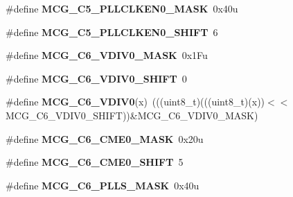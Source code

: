 \begin{DoxyCompactItemize}
\item 
\#define {\bfseries M\+C\+G\+\_\+\+C5\+\_\+\+P\+L\+L\+C\+L\+K\+E\+N0\+\_\+\+M\+A\+SK}~0x40u\hypertarget{group__MCG__Register__Masks_ga73671453b8f8804784e5b7e67551726d}{}\label{group__MCG__Register__Masks_ga73671453b8f8804784e5b7e67551726d}

\item 
\#define {\bfseries M\+C\+G\+\_\+\+C5\+\_\+\+P\+L\+L\+C\+L\+K\+E\+N0\+\_\+\+S\+H\+I\+FT}~6\hypertarget{group__MCG__Register__Masks_gaa66ceed70e1055a31e46c60a502b8eb7}{}\label{group__MCG__Register__Masks_gaa66ceed70e1055a31e46c60a502b8eb7}

\item 
\#define {\bfseries M\+C\+G\+\_\+\+C6\+\_\+\+V\+D\+I\+V0\+\_\+\+M\+A\+SK}~0x1\+Fu\hypertarget{group__MCG__Register__Masks_gacf93ac207865bd372d9148f10dce7267}{}\label{group__MCG__Register__Masks_gacf93ac207865bd372d9148f10dce7267}

\item 
\#define {\bfseries M\+C\+G\+\_\+\+C6\+\_\+\+V\+D\+I\+V0\+\_\+\+S\+H\+I\+FT}~0\hypertarget{group__MCG__Register__Masks_ga92208f56fc7ce68a0a8ff14ab5c3b2f6}{}\label{group__MCG__Register__Masks_ga92208f56fc7ce68a0a8ff14ab5c3b2f6}

\item 
\#define {\bfseries M\+C\+G\+\_\+\+C6\+\_\+\+V\+D\+I\+V0}(x)~(((uint8\+\_\+t)(((uint8\+\_\+t)(x))$<$$<$M\+C\+G\+\_\+\+C6\+\_\+\+V\+D\+I\+V0\+\_\+\+S\+H\+I\+FT))\&M\+C\+G\+\_\+\+C6\+\_\+\+V\+D\+I\+V0\+\_\+\+M\+A\+SK)\hypertarget{group__MCG__Register__Masks_ga50b2068270153c3013b4e0ac2256fbfd}{}\label{group__MCG__Register__Masks_ga50b2068270153c3013b4e0ac2256fbfd}

\item 
\#define {\bfseries M\+C\+G\+\_\+\+C6\+\_\+\+C\+M\+E0\+\_\+\+M\+A\+SK}~0x20u\hypertarget{group__MCG__Register__Masks_ga2e0daa102ec3f225ed9297f7bc9f8239}{}\label{group__MCG__Register__Masks_ga2e0daa102ec3f225ed9297f7bc9f8239}

\item 
\#define {\bfseries M\+C\+G\+\_\+\+C6\+\_\+\+C\+M\+E0\+\_\+\+S\+H\+I\+FT}~5\hypertarget{group__MCG__Register__Masks_ga096e62e71f69f5b749999d671d800090}{}\label{group__MCG__Register__Masks_ga096e62e71f69f5b749999d671d800090}

\item 
\#define {\bfseries M\+C\+G\+\_\+\+C6\+\_\+\+P\+L\+L\+S\+\_\+\+M\+A\+SK}~0x40u\hypertarget{group__MCG__Register__Masks_ga66a1dfdde86a9c165d7bdec17c77578f}{}\label{group__MCG__Register__Masks_ga66a1dfdde86a9c165d7bdec17c77578f}


\end{DoxyCompactItemize}
